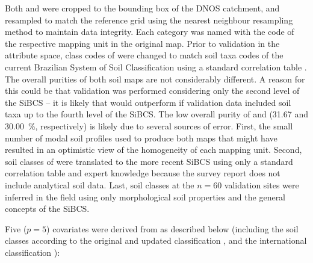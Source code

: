 Both \soilOld{} and \soilNew{} were cropped to the bounding box of the DNOS catchment, and resampled to match 
the reference grid using the nearest neighbour resampling method to maintain data integrity. Each category was 
named with the code of the respective mapping unit in the original map. Prior to validation in the attribute 
space, class codes of \soilOld{} were changed to match soil taxa codes of the current Brazilian System of Soil 
Classification using a standard correlation table \cite{SantosEtAl2006}. The overall purities of both soil maps 
are not considerably different. A reason for this could be that validation was performed considering only the 
second level of the SiBCS -- it is likely that \soilNew{} would outperform \soilOld{} if validation data 
included soil taxa up to the fourth level of the SiBCS. The low overall purity of \soilOld{} and 
\soilNew{} (\num{31.67} and \SI{30.00}{\percent}, respectively) is likely due to several sources of error. 
First, the small number of modal soil profiles used to produce both maps that might have resulted in an 
optimistic view of the homogeneity of each mapping unit. Second, soil classes of \soilOld{} were translated to 
the more recent SiBCS using only a standard correlation table \cite{SantosEtAl2006} and expert knowledge 
because the survey report does not include analytical soil data. Last, soil classes at the $n = 60$ validation 
sites were inferred in the field using only morphological soil properties and the general concepts of the 
SiBCS.

Five ($p = 5$) covariates were derived from \soilOld{} as described below (including the soil classes 
according to the original and updated classification \cite{AzolinEtAl1988, SantosEtAl2013a}, and the 
international classification \cite{IUSSWorkingGroupWRB2007}):

